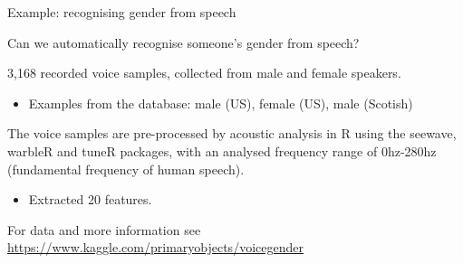 \documentclass[compress]{beamer}
\begin{document}
\begin{frame}{Example: recognising gender from speech}

Can we automatically recognise someone's gender from speech?

3,168 recorded voice samples, collected from male and female speakers.

\begin{itemize}

\item
  Examples from the database: male (US), female (US), male (Scotish)
\end{itemize}

The voice samples are pre-processed by acoustic analysis in R using the
seewave, warbleR and tuneR packages, with an analysed frequency range of
0hz-280hz (fundamental frequency of human speech).

\begin{itemize}

\item
  Extracted 20 features.
\end{itemize}

For data and more information see
\url{https://www.kaggle.com/primaryobjects/voicegender}

\end{frame}
\end{document}

